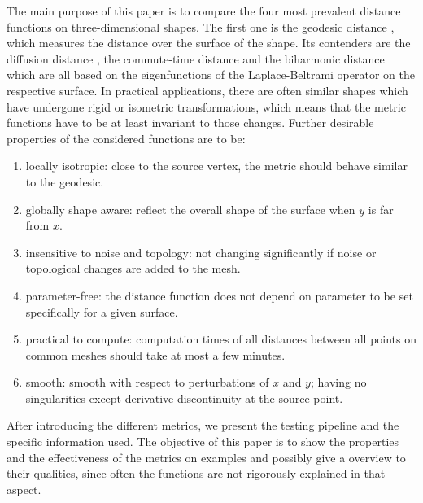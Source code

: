 The main purpose of this paper is to compare the four most prevalent distance functions on three-dimensional shapes.
The first one is the geodesic distance \cite{surazhsky2005fast,kimmel1998computing}, which measures the distance over the surface of the shape.
Its contenders are the diffusion distance \cite{sun2009concise}, the commute-time distance \cite{fouss2007random,lipman2010biharmonic} and the biharmonic distance \cite{lipman2010biharmonic} which are all based on the eigenfunctions of the Laplace-Beltrami operator on the respective surface.
In practical applications, there are often similar shapes which have undergone rigid or isometric transformations, which means that the metric functions have to be at least invariant to those changes.
Further desirable properties of the considered functions are to be:
\begin{enumerate}
	\item locally isotropic: close to the source vertex, the metric should behave similar to the geodesic.
	\item globally shape aware: reflect the overall shape of the surface when $y$ is far from $x$.
	\item insensitive to noise and topology: not changing significantly if noise or topological changes are added to the mesh.
	\item parameter-free: the distance function does not depend on parameter to be set specifically for a given surface.
	\item practical to compute: computation times of all distances between all points on common meshes should take at most a few minutes.
	\item smooth: smooth with respect to perturbations of $x$ and $y$; having no singularities except derivative discontinuity at the source point.
\end{enumerate}

After introducing the different metrics, we present the testing pipeline and the specific information used.
The objective of this paper is to show the properties and the effectiveness of the metrics on examples and possibly give a overview to their qualities, since often the functions are not rigorously explained in that aspect.

